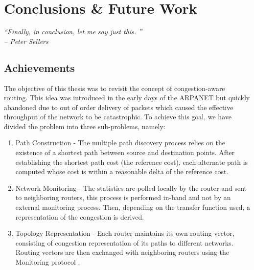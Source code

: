 \def\baselinestretch{1}
\chapter{Conclusions \& Future Work} 
\ifpdf
    \graphicspath{{8-Conclusions/ConclusionsFigs/PNG/}{8-Conclusions/ConclusionsFigs/PDF/}{8-Conclusions/ConclusionsFigs/}}
\else
    \graphicspath{{8-Conclusions/ConclusionsFigs/EPS/}{8-Conclusions/ConclusionsFigs/}}
\fi
\begin{flushright}
 \textit{\textquotedblleft Finally, in conclusion, let me say just
this. \textquotedblright}\\
\textit{-- Peter Sellers}
\end{flushright}

\section{Achievements}

The objective of this thesis was to revisit the concept of congestion-aware routing. This idea was introduced in the early days of the ARPANET but quickly abandoned due to out of order delivery of packets which caused the effective throughput of the network to be catastrophic. To achieve this goal, we have divided the problem into three sub-problems, namely:

\begin{enumerate}
\item Path Construction -  The multiple path discovery process relies on the existence of a shortest path between source and destination points. After establishing the shortest path cost (the reference cost), each alternate path is computed whose cost is within a reasonable delta of the reference cost. 
\item Network Monitoring - The statistics are polled locally by the router and sent to neighboring routers, this process is performed in-band and not by an external monitoring process. Then, depending on the transfer function used, a representation of the congestion is derived.
\item Topology Representation - Each router maintains its own routing vector, consisting of congestion representation of its paths to different networks. Routing vectors are then exchanged with neighboring routers using the Monitoring protocol .
\end{enumerate}

